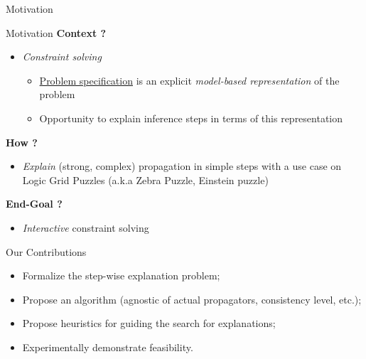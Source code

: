 \documentclass{beamer}
\begin{document}
\begin{frame}{Motivation}
\end{frame}

\begin{frame}{Motivation}
    \vfill
    \textbf{Context ?}
    \begin{itemize}
        \item \textit{Constraint solving}
              \begin{itemize}
                  \item \underline{Problem specification} is an explicit \emph{model-based representation} of the problem
                  \item Opportunity to explain inference steps in terms of this representation
              \end{itemize}
    \end{itemize}\pause
    \vfill
    \textbf{How ?}
    \begin{itemize}
        \item \emph{Explain} (strong, complex) propagation in simple steps with a use case on Logic Grid Puzzles (a.k.a Zebra Puzzle, Einstein puzzle)\pause
    \end{itemize}
    \vfill
    \textbf{End-Goal ?}
    \begin{itemize}
        \item \emph{Interactive} constraint solving
    \end{itemize}

    \vfill

\end{frame}



\begin{frame}{Our Contributions}

    \begin{itemize}
        \item Formalize the step-wise explanation problem;
        \item Propose an algorithm (agnostic of actual propagators, consistency level, etc.);
        \item Propose heuristics for guiding the search for explanations;
        \item Experimentally demonstrate feasibility.
    \end{itemize}
\end{frame}
\end{document}
